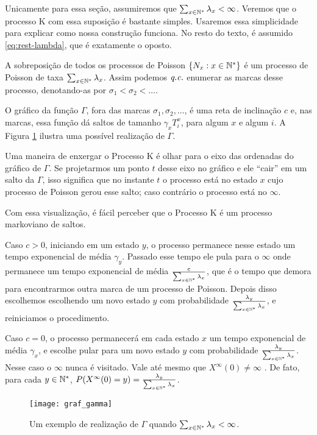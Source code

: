 Unicamente para essa seção, assumiremos que $\sum_{x \in {\mathbb{N^*}}}
\lambda_x < \infty$. Veremos que o processo K com essa suposição é
bastante simples. Usaremos essa simplicidade para explicar como nossa
construção funciona.  No resto do texto, é assumido
\eqref{eq:rest-lambda}, que é exatamente o oposto.

A sobreposição de todos os processos de Poisson $\{N_x : x \in {\mathbb{N^*}}\}$
é um processo de Poisson de taxa $\sum_{x \in {\mathbb{N^*}}}
\lambda_x$. Assim podemos ${\emph{q.c.}}$ enumerar as marcas desse processo,
denotando-as por \mbox{$ \sigma_1 < \sigma_2 < \ldots$}.

O gráfico da função $\Gamma$, fora das marcas $\sigma_1, \sigma_2,
\ldots$, é uma reta de inclinação $c$ e, nas marcas, essa função dá
saltos de tamanho $\gamma_x T^x_i$, para algum $x$ e algum $i$. A
Figura \ref{fig:graf_gamma} ilustra uma possível realização de
$\Gamma$.

Uma maneira de enxergar o Processo K é olhar para o eixo das ordenadas
do gráfico de $\Gamma$. Se projetarmos um ponto $t$ desse eixo no
gráfico e ele ``cair'' em um salto da $\Gamma$, isso significa que no
instante $t$ o processo está no estado $x$ cujo processo de Poisson
gerou esse salto; caso contrário o processo está no $\infty$.

Com essa visualização, é fácil perceber que o Processo K é um processo
markoviano de saltos.

Caso $c > 0$, iniciando em um estado $y$, o processo permanece nesse
estado um tempo exponencial de média $\gamma_y$. Passado esse tempo
ele pula para o $\infty$ onde permanece um tempo exponencial de média
$\frac{c}{\sum_{x \in {\mathbb{N^*}}} \lambda_x}$, que é o tempo que demora para
encontrarmos outra marca de um processo de Poisson. Depois disso
escolhemos escolhendo um novo estado $y$ com probabilidade
$\frac{\lambda_y}{\sum_{x \in {\mathbb{N^*}}} \lambda_x}$, e reiniciamos o
procedimento.

Caso $c=0$, o processo permanecerá em cada estado $x$ um tempo
exponencial de média $\gamma_x$, e escolhe pular para um novo estado
$y$ com probabilidade $\frac{\lambda_y}{\sum_{x \in {\mathbb{N^*}}} \lambda_x}$.
Nesse caso o $\infty$ nunca é visitado. Vale até mesmo que
$X^\infty(0) \neq \infty$ \qc. De fato, para cada $y \in {\mathbb{N^*}}$, 
$P(X^\infty(0) = y) = \frac{\lambda_y}{\sum_{x \in {\mathbb{N^*}}} \lambda_x}$.

\begin{figure}
  \centering
  \texttt{[image: graf\_gamma]}
  \caption{Um exemplo de realização de $\Gamma$ quando $\sum_{x \in
      {\mathbb{N^*}}} \lambda_x < \infty$.}
  \label{fig:graf_gamma}
\end{figure}

